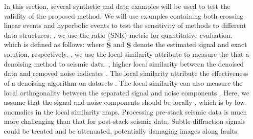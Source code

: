In this section, several synthetic and  data examples will be used to test the validity of the proposed method. We will use examples containing both crossing linear events and hyperbolic events to test the sensitivity of methods to different data structures. , we use the  ratio (SNR) metric for quantitative evaluation, which is defined as follows:
where $\hat{\mathbf{S}}$ and $\mathbf{S}$ denote the estimated signal and exact solution, respectively. ,  we use the local similarity attribute \cite[]{yangkang2015ortho} to measure the  that a denoising method  to seismic data. , higher local similarity between the denoised data and removed noise indicates . The local similarity attribute  the effectiveness of a denoising algorithm on datasets . The local similarity can also measure the local orthogonality between the separated signal and noise components \cite[]{yangkang2015ortho}. Here, we assume that the signal and noise components should be locally , which is  by low anomalies in the local similarity maps. Processing pre-stack seismic data is much more challenging than that for post-stack seismic data.  Subtle diffraction signals could be treated  and be attenuated, potentially damaging images along faults. 

